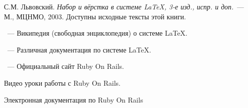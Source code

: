 \begin{thebibliography}{}

С.М. Львовский.
{\em Набор и вёрстка в системе \LaTeX, 3-е изд., испр. и доп.}~---
М., МЦНМО, 2003. Доступны исходные тексты этой книги.

~---
Википедия (свободная энциклопедия) о системе \LaTeX.

~---
Различная документация по системе \LaTeX.

~---
Официальный сайт Ruby On Rails.

Видео уроки работы с Ruby On Rails.

Электронная документация по Ruby On Rails 

\end{thebibliography}

\endinput
